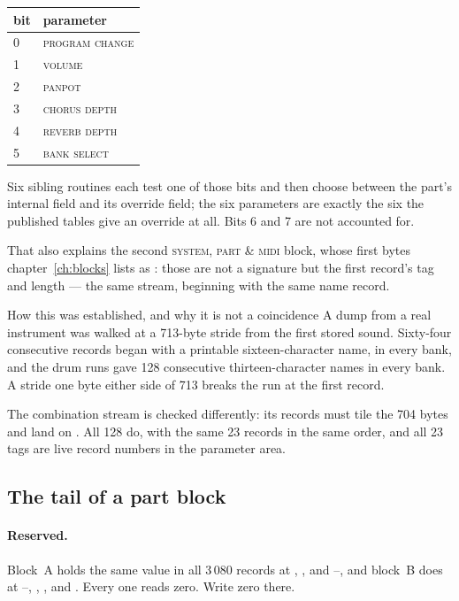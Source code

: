 \begin{center}
\begin{tabular}{ll}
\toprule
bit & parameter \\
\midrule
0 & \textsc{program change} \\
1 & \textsc{volume} \\
2 & \textsc{panpot} \\
3 & \textsc{chorus depth} \\
4 & \textsc{reverb depth} \\
5 & \textsc{bank select} \\
\bottomrule
\end{tabular}
\end{center}

Six sibling routines each test one of those bits and then choose between the part's
internal field and its override field; the six parameters are exactly the six the
published tables give an override at all. Bits 6 and 7 are not accounted for.

That also explains the second \textsc{system, part \& midi} block, whose first bytes
chapter~\ref{ch:blocks} lists as : those are not a signature but the first
record's tag and length --- the same stream, beginning with the same name record.

\begin{note}{How this was established, and why it is not a coincidence}
A dump from a real instrument was walked at a 713-byte stride from the first stored
sound. Sixty-four consecutive records began with a printable sixteen-character name, in
every bank, and the drum runs gave 128 consecutive thirteen-character names in every bank.
A stride one byte either side of 713 breaks the run at the first record.

The combination stream is checked differently: its records must tile the 704 bytes and
land on . All 128 do, with the same 23 records in the same order, and all 23
tags are live record numbers in the parameter area.
\end{note}

\subsection{The tail of a part block}\label{sec:combtail}

\paragraph{Reserved.} Block~A holds the same value in all 3\,080 records at ,
  ,  and --, and block~B does at
  --, , ,  and . Every
  one reads zero. Write zero there.

